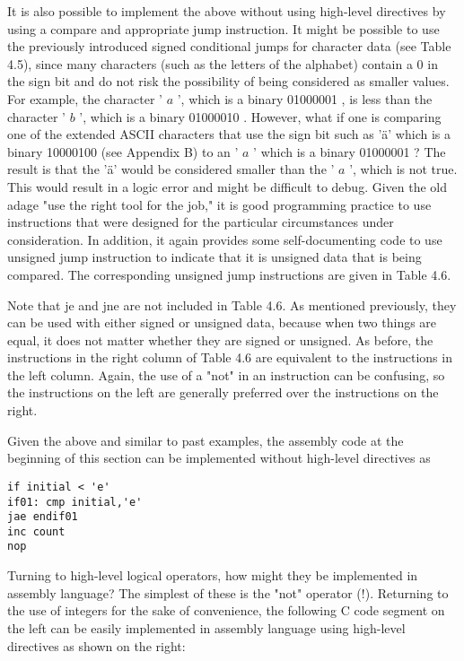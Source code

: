 \documentclass[10pt]{article}
\begin{document}
It is also possible to implement the above without using high-level directives by using a compare and appropriate jump instruction. It might be possible to use the previously introduced signed conditional jumps for character data (see Table 4.5), since many characters (such as the letters of the alphabet) contain a 0 in the sign bit and do not risk the possibility of being considered as smaller values. For example, the character ' $a$ ', which is a binary 01000001 , is less than the character ' $b$ ', which is a binary 01000010 . However, what if one is comparing one of the extended ASCII characters that use the sign bit such as 'ä' which is a binary 10000100 (see Appendix B) to an ' $a$ ' which is a binary 01000001 ? The result is that the 'ä' would be considered smaller than the ' $a$ ', which is not true. This would result in a logic error and might be difficult to debug. Given the old adage "use the right tool for the job," it is good programming practice to use instructions that were designed for the particular circumstances under consideration. In addition, it again provides some self-documenting code to use unsigned jump instruction to indicate that it is unsigned data that is being compared. The corresponding unsigned jump instructions are given in Table 4.6.

Note that je and jne are not included in Table 4.6. As mentioned previously, they can be used with either signed or unsigned data, because when two things are equal, it does not matter whether they are signed or unsigned. As before, the instructions in the right column of Table 4.6 are equivalent to the instructions in the left column. Again, the use of a "not" in an instruction can be confusing, so the instructions on the left are generally preferred over the instructions on the right.

Given the above and similar to past examples, the assembly code at the beginning of this section can be implemented without high-level directives as

\begin{verbatim}
if initial < 'e'
if01: cmp initial,'e'
jae endif01
inc count
nop
\end{verbatim}

Turning to high-level logical operators, how might they be implemented in assembly language? The simplest of these is the "not" operator (!). Returning to the use of integers for the sake of convenience, the following C code segment on\\
the left can be easily implemented in assembly language using high-level directives as shown on the right:
\end{document}
